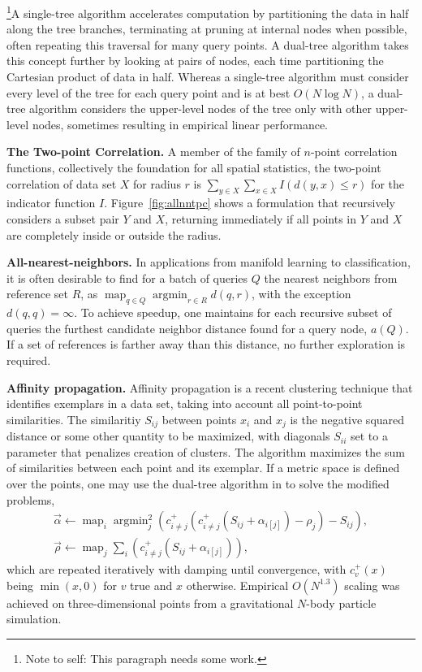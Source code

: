 \documentclass[times, leqno,twocolumn]{article}
\newcommand{\authornote}[1]{\footnote{Note to self: #1}}
\DeclareMathOperator*{\map}{map}
\DeclareMathOperator*{\argmin}{argmin}
\newcommand{\ocpos}[1]{c^{+}_{#1}}
\newcommand{\cpos}[2]{\ocpos{#1 \neq #2}}
\newcommand{\simil}[2]{S_{#1#2}}
\newcommand{\vecrho}{\vec{\rho}}
\newcommand{\vecalpha}{\vec{\alpha}}
\newcommand{\frho}[1]{\rho_{#1}}
\newcommand{\falphaj}[2]{\alpha_{#1[#2]}}
\begin{document}
\authornote{This paragraph needs some work.}A single-tree algorithm accelerates computation by partitioning the data in half along the tree branches, terminating at pruning at internal nodes when possible, often repeating this traversal for many query points.
A dual-tree algorithm takes this concept further by looking at pairs of nodes, each time partitioning the Cartesian product of data in half.
Whereas a single-tree algorithm must consider every level of the tree for each query point and is at best $O(N \log N)$, a dual-tree algorithm considers the upper-level nodes of the tree only with other upper-level nodes, sometimes resulting in empirical linear performance.

{\bf The Two-point Correlation.} A member of the family of $n$-point correlation functions, collectively the foundation for all spatial statistics, the two-point correlation of data set $X$ for radius $r$ is
$\sum_{y \in X} \sum_{x \in X} I(d(y, x) \leq r)$ for the indicator function $I$.
Figure~\ref{fig:allnntpc} shows a formulation that recursively considers a subset pair $Y$ and $X$, returning immediately if all points in $Y$ and $X$ are completely inside or outside the radius.

{\bf All-nearest-neighbors.} In applications from manifold learning to classification, it is often desirable to find for a batch of queries $Q$ the nearest neighbors from reference set $R$, as $\map_{q \in Q} \argmin_{r \in R} d(q,r)$, with the exception $d(q,q) = \infty$.
To achieve speedup, one maintains for each recursive subset of queries the furthest candidate neighbor distance found for a query node, $a(Q)$.
If a set of references is farther away than this distance, no further exploration is required.

{\bf Affinity propagation.}
Affinity propagation is a recent clustering technique that identifies exemplars in a data set, taking into account all point-to-point similarities\cite{frey_dueck}.
The similaritiy $\simil{i}{j}$ between points $x_i$ and $x_j$ is the negative squared distance or some other quantity to be maximized, with diagonals $\simil{i}{i}$ set to a parameter that penalizes creation of clusters.
The algorithm maximizes the sum of similarities between each point and its exemplar.
If a metric space is defined over the points, one may use the dual-tree algorithm in \cite{ryan_nips} to solve the modified problems,
\[ \begin{array}{l}
  \vecalpha \gets \map_{i} \argmin^2_{j} \!\left( \cpos{i}{j}(\cpos{i}{j}(\simil{i}{j} + \falphaj{i}{j}) - \frho{j}) - \simil{i}{j} \right)\! ,
  \\
  \vecrho \gets \map_{j} \sum_{i} \!\left( \cpos{i}{j}(\simil{i}{j} + \falphaj{i}{j}) \right)\!,
\end{array} \]
\noindent which are repeated iteratively with damping until convergence, with $\ocpos{v}(x)$ being $\min(x, 0)$ for $v$ true and $x$ otherwise.
Empirical $O(N^{1.3})$ scaling was achieved on three-dimensional points from a gravitational $N$-body particle simulation.
\end{document}
